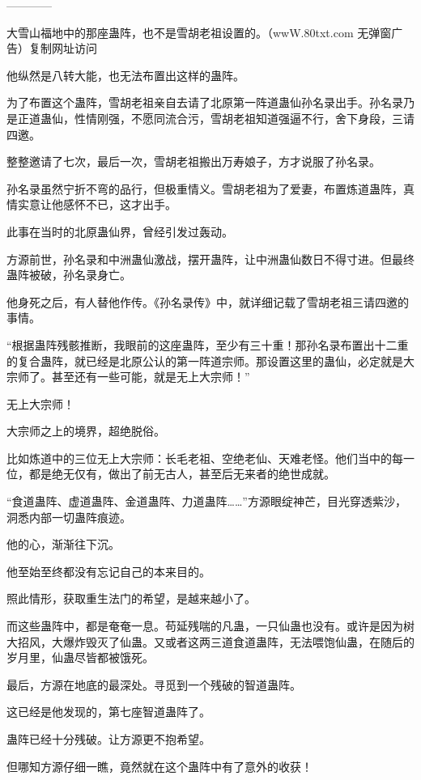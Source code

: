 
\begin{this_body}

------------

大雪山福地中的那座蛊阵，也不是雪胡老祖设置的。（wwW.80txt.com 无弹窗广告）复制网址访问

他纵然是八转大能，也无法布置出这样的蛊阵。

为了布置这个蛊阵，雪胡老祖亲自去请了北原第一阵道蛊仙孙名录出手。孙名录乃是正道蛊仙，性情刚强，不愿同流合污，雪胡老祖知道强逼不行，舍下身段，三请四邀。

整整邀请了七次，最后一次，雪胡老祖搬出万寿娘子，方才说服了孙名录。

孙名录虽然宁折不弯的品行，但极重情义。雪胡老祖为了爱妻，布置炼道蛊阵，真情实意让他感怀不已，这才出手。

此事在当时的北原蛊仙界，曾经引发过轰动。

方源前世，孙名录和中洲蛊仙激战，摆开蛊阵，让中洲蛊仙数日不得寸进。但最终蛊阵被破，孙名录身亡。

他身死之后，有人替他作传。《孙名录传》中，就详细记载了雪胡老祖三请四邀的事情。

“根据蛊阵残骸推断，我眼前的这座蛊阵，至少有三十重！那孙名录布置出十二重的复合蛊阵，就已经是北原公认的第一阵道宗师。那设置这里的蛊仙，必定就是大宗师了。甚至还有一些可能，就是无上大宗师！”

无上大宗师！

大宗师之上的境界，超绝脱俗。

比如炼道中的三位无上大宗师：长毛老祖、空绝老仙、天难老怪。他们当中的每一位，都是绝无仅有，做出了前无古人，甚至后无来者的绝世成就。

“食道蛊阵、虚道蛊阵、金道蛊阵、力道蛊阵……”方源眼绽神芒，目光穿透紫沙，洞悉内部一切蛊阵痕迹。

他的心，渐渐往下沉。

他至始至终都没有忘记自己的本来目的。

照此情形，获取重生法门的希望，是越来越小了。

而这些蛊阵中，都是奄奄一息。苟延残喘的凡蛊，一只仙蛊也没有。或许是因为树大招风，大爆炸毁灭了仙蛊。又或者这两三道食道蛊阵，无法喂饱仙蛊，在随后的岁月里，仙蛊尽皆都被饿死。

最后，方源在地底的最深处。寻觅到一个残破的智道蛊阵。

这已经是他发现的，第七座智道蛊阵了。

蛊阵已经十分残破。让方源更不抱希望。

但哪知方源仔细一瞧，竟然就在这个蛊阵中有了意外的收获！


\end{this_body}
